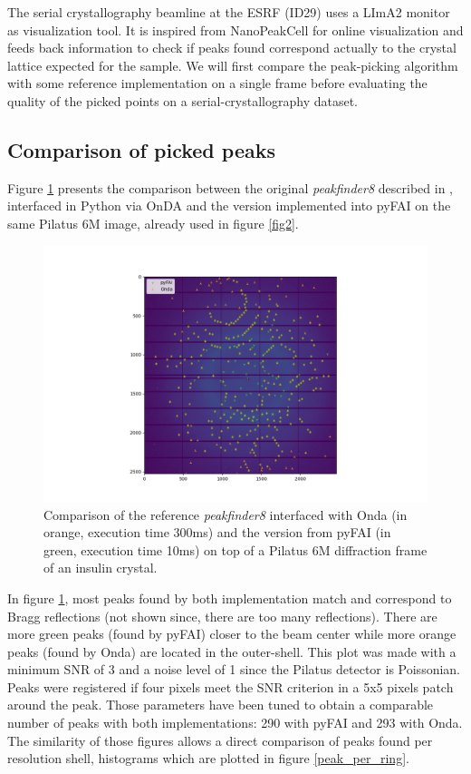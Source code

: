 \documentclass[preprint]{iucr}              %
\begin{document}
The serial crystallography beamline at the ESRF (ID29) uses a LImA2 monitor \cite{lima2} as visualization tool.
It is inspired from  NanoPeakCell \cite{nanopeakcell} for online visualization and feeds back information to check if peaks found correspond actually to the crystal lattice expected for the sample.
We will first compare the peak-picking algorithm with some reference implementation on a single frame before evaluating the quality of the picked points on a serial-crystallography dataset.

\subsection{Comparison of picked peaks}
Figure \ref{peakfinder} presents the comparison between the original \textit{peakfinder8} described in , interfaced in Python via OnDA \cite{onda} and the version implemented into pyFAI on the same Pilatus 6M image, already used in figure \ref{fig2}. 

\begin{figure}
\label{peakfinder}
\includegraphics[width=12cm]{peakfinder}
\caption{Comparison of the reference \textit{peakfinder8} interfaced with Onda (in orange, execution time 300ms) and the version from pyFAI (in green, execution time 10ms) on top of a Pilatus 6M diffraction frame of an insulin crystal.}
\end{figure}

In figure \ref{peakfinder}, most peaks found by both implementation match and correspond to Bragg reflections (not shown since, there are too many reflections).
There are more green peaks (found by pyFAI) closer to the beam center while more orange peaks (found by Onda) are located in the outer-shell.
This plot was made with a minimum SNR of 3 and a noise level of 1 since the Pilatus detector is Poissonian.
Peaks were registered if four pixels meet the SNR criterion in a 5x5 pixels patch around the peak.
Those parameters have been tuned to obtain a comparable number of peaks with both implementations: 290 with pyFAI and 293 with Onda.
The similarity of those figures allows a direct comparison of peaks found per resolution shell, histograms which are plotted in figure \ref{peak_per_ring}.
\end{document}
